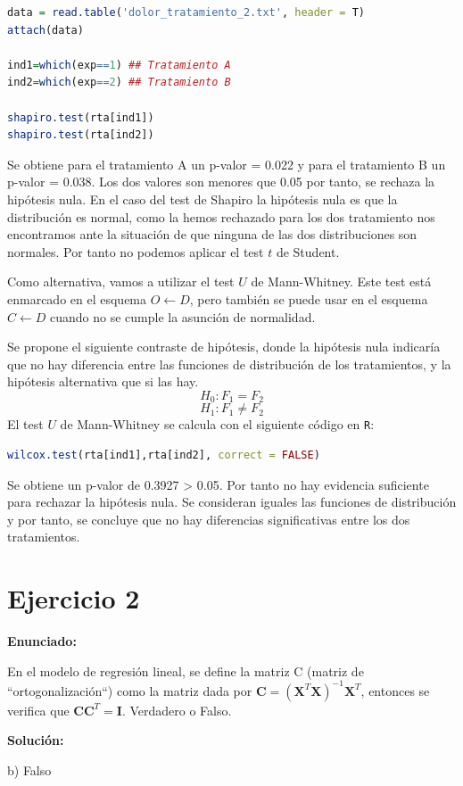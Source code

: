 \documentclass[a4paper]{article}
\begin{document}
\begin{lstlisting}[language=R]
data = read.table('dolor_tratamiento_2.txt', header = T)
attach(data)

ind1=which(exp==1) ## Tratamiento A
ind2=which(exp==2) ## Tratamiento B

shapiro.test(rta[ind1])
shapiro.test(rta[ind2])
\end{lstlisting}
Se obtiene para el tratamiento A un p-valor = 0.022 y para el tratamiento B un p-valor = 0.038. Los dos valores son menores que 0.05 por tanto, se rechaza la hipótesis nula. En el caso del test de Shapiro la hipótesis nula es que la distribución es normal, como la hemos rechazado para los dos tratamiento nos encontramos ante la situación de que ninguna de las dos distribuciones son normales. Por tanto no podemos aplicar el test $t$ de Student. \par
Como alternativa, vamos a utilizar el test $U$ de Mann-Whitney. Este test está enmarcado en el esquema $O \leftarrow D$, pero también se puede usar en el esquema $C \leftarrow D$ cuando no se cumple la asunción de normalidad.\par
Se propone el siguiente contraste de hipótesis, donde la hipótesis nula indicaría que no hay diferencia entre las funciones de distribución de los tratamientos, y la hipótesis alternativa que si las hay.
\[ H_0 : F_1 = F_2   \]
\[ H_1 : F_1 \ne F_2    \]
El test $U$ de Mann-Whitney se calcula con el siguiente código en \verb|R|:
\begin{lstlisting}[language=R]
wilcox.test(rta[ind1],rta[ind2], correct = FALSE)
\end{lstlisting}
Se obtiene un p-valor de 0.3927 > 0.05. Por tanto no hay evidencia suficiente para rechazar la hipótesis nula. Se consideran iguales las funciones de distribución y por tanto, se concluye que no hay diferencias significativas entre los dos tratamientos. 

\section{Ejercicio 2}

\textbf{Enunciado:}\par
En el modelo de regresión lineal, se define la matriz C (matriz de ``ortogonalización``) como la matriz dada por $\mathbf{C} = (\mathbf{X}^T\mathbf{X})^{-1}\mathbf{X}^T$, entonces se verifica que $\mathbf{C}\mathbf{C}^T = \mathbf{I}$. Verdadero o Falso.\par
\textbf{Solución:}\par
b) Falso \par
\end{document}
